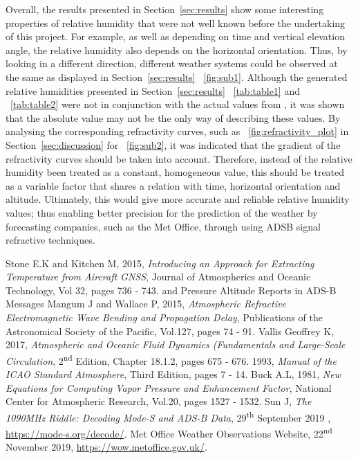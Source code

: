 \documentclass[11pt]{article}
\newcommand{\figref}[2][\figurename~]{#1\ref{#2}}
\newcommand{\tabref}[2][\tablename~]{#1\ref{#2}}
\newcommand{\secref}[2][Section~]{#1\ref{#2}}
\begin{document}
Overall, the results presented in \secref{sec:results} show some interesting properties of relative humidity that were not well known before the undertaking of this project. For example, as well as depending on time and vertical elevation angle, the relative humidity also depends on the horizontal orientation. Thus, by looking in a different direction, different weather systems could be observed at the same as displayed in \secref{sec:results} \figref{fig:sub1}. Although the generated relative humidities presented in \secref{sec:results} \tabref{tab:table1} and \tabref{tab:table2} were not in conjunction with the actual values from \cite{Web01}, it was shown that the absolute value may not be the only way of describing these values. By analysing the corresponding refractivity curves, such as \figref{fig:refractivity_plot} in \secref{sec:discussion} for \figref{fig:sub2}, it was indicated that the gradient of the refractivity curves should be taken into account. Therefore, instead of the relative humidity been treated as a constant, homogeneous value, this should be treated as a variable factor that shares a relation with time, horizontal orientation and altitude. Ultimately, this would give more accurate and reliable relative humidity values; thus enabling better precision for the prediction of the weather by forecasting companies, such as the Met Office, through using ADSB signal refractive techniques.


\begin{thebibliography}{9}
 Stone E.K and Kitchen M, 2015, \textit{Introducing an Approach for Extracting Temperature from Aircraft GNSS}, Journal of Atmospherics and Oceanic Technology, Vol 32, pages 736 - 743. 
and Pressure Altitude Reports in ADS-B Messages
 Mangum J and Wallace P, 2015, \textit{Atmospheric Refractive Electromagnetic Wave Bending and Propagation Delay}, Publications of the Astronomical Society of the Pacific, Vol.127, pages 74 - 91.
 Vallis Geoffrey K, 2017, \textit{Atmospheric and Oceanic Fluid Dynamics (Fundamentals and Large-Scale Circulation}, 2\textsuperscript{nd} Edition, Chapter 18.1.2, pages 675 - 676.
 1993, \textit{Manual of the ICAO Standard Atmosphere}, Third Edition, pages 7 - 14.
 Buck A.L, 1981, \textit{New Equations for Computing Vapor Pressure and Enhancement Factor}, National Center for Atmospheric Research, Vol.20, pages 1527 - 1532.
 Sun J, \textit{The 1090MHz Riddle: Decoding Mode-S and ADS-B Data}, 29\textsuperscript{th} September 2019 , \url{https://mode-s.org/decode/}.  
 Met Office Weather Observations Website, 22\textsuperscript{nd} November 2019,  \url{https://wow.metoffice.gov.uk/}.


\end{thebibliography}
\end{document}
